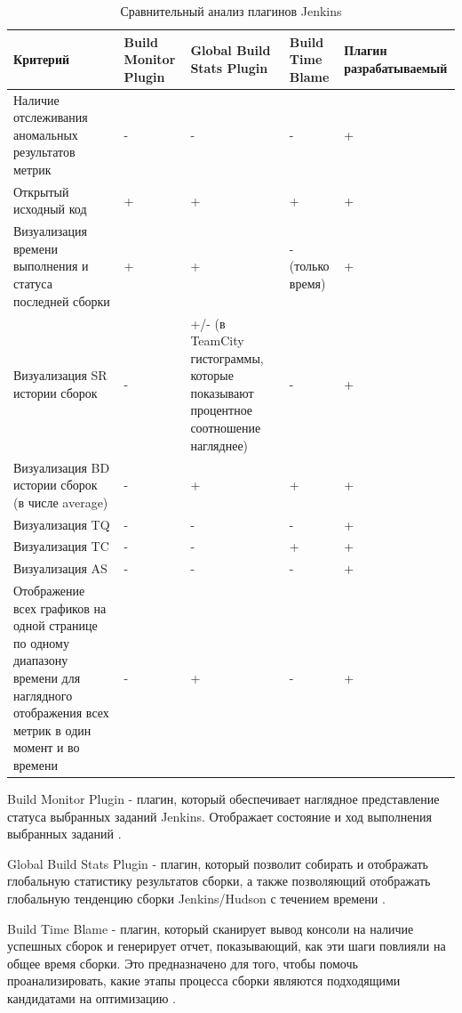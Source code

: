 \begin{table}
    \centering
    \caption{Сравнительный анализ плагинов Jenkins}
    \begin{tabular}{|p{5cm}|p{2cm}|p{3cm}|p{3cm}|p{2cm}|}
    \hline
        Критерий & Build Monitor Plugin & Global Build Stats Plugin  & Build Time Blame & Плагин разрабатываемый  \\ \hline
        Наличие отслеживания аномальных результатов метрик  & - & - & - & +  \\ \hline
        Открытый исходный код  & + &+ & + & +  \\ \hline
        Визуализация времени выполнения и статуса последней сборки & + &+ & - (только время) &+  \\ \hline
        Визуализация SR истории сборок & - & +/- (в TeamCity гистограммы, которые показывают процентное соотношение нагляднее) & - & +  \\ \hline
       Визуализация BD истории сборок (в числе average) & - & + & +  & +  \\ \hline
       Визуализация TQ & - & - & -  &+  \\ \hline
      Визуализация TC & - & - & +  & +  \\ \hline
      Визуализация AS & - &- &-  & +  \\ \hline
       Отображение всех графиков на одной странице по одному диапазону времени для наглядного отображения всех метрик в один момент и во времени & - & + & -  & +  \\ \hline


    \end{tabular}
\end{table}	

 Build Monitor Plugin - плагин, который обеспечивает наглядное представление статуса выбранных заданий Jenkins. Отображает состояние и ход выполнения выбранных заданий \cite{buildmonitor}.
 
 Global Build Stats Plugin - плагин, который позволит собирать и отображать глобальную статистику результатов сборки, а также позволяющий отображать глобальную тенденцию сборки Jenkins/Hudson с течением времени  \cite{gstats}.
 
  Build Time Blame - плагин, который сканирует вывод консоли на наличие успешных сборок и генерирует отчет, показывающий, как эти шаги повлияли на общее время сборки. Это предназначено для того, чтобы помочь проанализировать, какие этапы процесса сборки являются подходящими кандидатами на оптимизацию  \cite{buildblame}.
  
